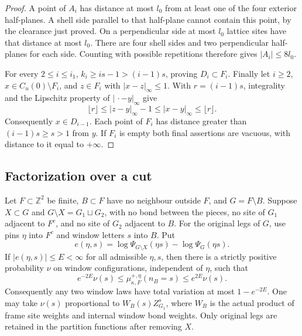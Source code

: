 \begin{proof}
A point of \(A_i\) has distance at most \(l_0\) from at least
one of the four exterior half-planes.  A shell side parallel to
that half-plane cannot contain this point, by the clearance just
proved.  On a perpendicular side at most \(l_0\) lattice sites
have that distance at most \(l_0\).  There are four shell sides
and two perpendicular half-planes for each side.  Counting with
possible repetitions therefore gives \(|A_i|\le8l_0\).

For every \(2\le i\le i_1\),
\(k_i\ge is-1>(i-1)s\), proving \(D_i\subset F_i\).
Finally let \(i\ge2\), \(x\in C_u(0)\setminus F_i\), and
\(z\in F_i\) with \(|x-z|_\infty\le1\).  With \(r=(i-1)s\),
integrality and the Lipschitz property of \(|\,\cdot-y|_\infty\)
give
\[
 \lfloor r\rfloor\le |z-y|_\infty-1
       \le |x-y|_\infty\le\lfloor r\rfloor.
\]
Consequently \(x\in D_{i-1}\).  Each point of \(F_i\) has
distance greater than \((i-1)s\ge s>1\) from \(y\).
If \(F_i\) is empty both final assertions are vacuous, with
distance to it equal to \(+\infty\).
\end{proof}

\subsection{Factorization over a cut}

\begin{lemma}\label{l:cut}
Let \(F\subset\mathbb Z^2\) be finite, \(B\subset F\) have no
neighbour outside \(F\), and \(G=F\setminus B\).
Suppose \(X\subset G\) and \(G\setminus X=G_1\sqcup G_2\), with
no bond between the pieces, no site of \(G_1\) adjacent to \(F^c\),
and no site of \(G_2\) adjacent to \(B\).
For the original legs of \(G\), use pins \(\eta\) into \(F^c\)
and window letters \(s\) into \(B\). Put
\[
 e(\eta,s)=\log\Psi_{G\setminus X}(\eta s)-\log\Psi_G(\eta s).
\]
If \(|e(\eta,s)|\le E<\infty\) for all admissible \(\eta,s\),
then there is a strictly positive probability \(\nu\) on window
configurations, independent of \(\eta\), such that
\[
 e^{-2E}\nu(s)\le\mu^{+,\eta}_{\kappa,F}(n_B=s)
                         \le e^{2E}\nu(s).
\]
Consequently any two window laws have total variation at most
\(1-e^{-2E}\).
One may take \(\nu(s)\) proportional to \(W_B(s)Z_{G_1}^{s}\),
where \(W_B\) is the actual product of frame site weights and
internal window bond weights. Only original legs are retained in
the partition functions after removing \(X\).
\end{lemma}

